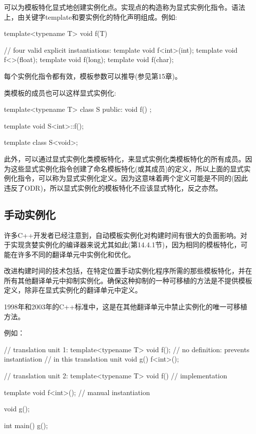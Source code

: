 
可以为模板特化显式地创建实例化点。实现点的构造称为显式实例化指令。语法上，由关键字template和要实例化的特化声明组成。例如:

\begin{cpp}
template<typename T>
void f(T)
{ }

// four valid explicit instantiations:
template void f<int>(int);
template void f<>(float);
template void f(long);
template void f(char);
\end{cpp}

每个实例化指令都有效，模板参数可以推导(参见第15章)。

类模板的成员也可以这样显式实例化:

\begin{cpp}
template<typename T>
class S {
	public:
	void f() {
	}
};

template void S<int>::f();

template class S<void>;
\end{cpp}

此外，可以通过显式实例化类模板特化，来显式实例化类模板特化的所有成员。因为这些显式实例化指令创建了命名模板特化(或其成员)的定义，所以上面的显式实例化指令，可以称为显式实例化定义。因为这意味着两个定义可能是不同的(因此违反了ODR)，所以显式实例化的模板特化不应该显式特化，反之亦然。

\subsection{手动实例化}

许多C++开发者已经注意到，自动模板实例化对构建时间有很大的负面影响。对于实现贪婪实例化的编译器来说尤其如此(第14.4.1节)，因为相同的模板特化，可能在许多不同的翻译单元中实例化和优化。

改进构建时间的技术包括，在特定位置手动实例化程序所需的那些模板特化，并在所有其他翻译单元中抑制实例化。确保这种抑制的一种可移植的方法是不提供模板定义，除非在显式实例化的翻译单元中定义。

\begin{notice}1998年和2003年的C++标准中，这是在其他翻译单元中禁止实例化的唯一可移植方法。
\end{notice}

例如：

\begin{cpp}
// translation unit 1:
template<typename T> void f(); // no definition: prevents instantiation
								// in this translation unit
void g()
{
	f<int>();
}

// translation unit 2:
template<typename T> void f()
{
	// implementation
}

template void f<int>(); // manual instantiation

void g();

int main()
{
	g();
}
\end{cpp}

